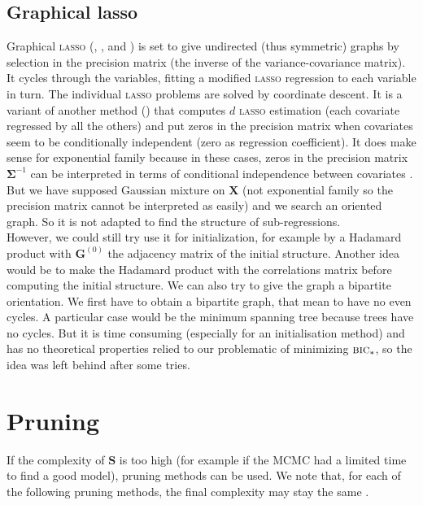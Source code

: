 \documentclass[12pt,a4paper]{report}
\begin{document}
	\subsection{Graphical { \sc lasso}}\label{sectionGlasso}
		Graphical \textsc{lasso} (\cite{friedman2008sparse}, \cite{witten2011new}, \cite{tibshiranilasso} and \cite{friedman2010applications}) is set to give undirected (thus symmetric) graphs by selection in the precision matrix (the inverse of the variance-covariance matrix). It cycles through the variables, fitting a modified \textsc{lasso} regression to each variable in turn. The individual \textsc{lasso} problems are solved by coordinate descent. It is a variant of another method (\cite{meinshausen2006high}) that computes $d$ \textsc{lasso} estimation (each covariate regressed by all the others) and put zeros in the precision matrix when covariates seem to be conditionally independent (zero as regression coefficient).
		It does make sense for exponential family because in these cases, zeros in the precision matrix $\boldsymbol{\Sigma}^{-1}$ can be interpreted in terms of conditional independence between covariates \cite{dempster1972covariance}. But we have supposed Gaussian mixture on $\boldsymbol{X}$ (not exponential family so the precision matrix cannot be interpreted as easily) and we search an oriented graph. So it is not adapted to find the structure of sub-regressions.\\
		
	However, we could still try use it for initialization, for example by a Hadamard product with $\boldsymbol{G}^{(0)}$ the adjacency matrix of the initial structure. Another idea would be to make the Hadamard product with the correlations matrix before computing the initial structure. We can also try to give the graph a bipartite orientation. We first have to obtain a bipartite graph, that mean to have no even cycles. A particular case would be the minimum spanning tree \cite{graham1985history,moret1991empirical,gower1969minimum} because trees have no cycles. But it is time consuming (especially for an initialisation method) and has no theoretical properties relied to our problematic of minimizing $\mbox{{\sc bic}}_*$, so the idea was left behind after some tries.		
	
	\section{Pruning}
		If the complexity of $\boldsymbol{S}$ is too high (for example if the MCMC had a limited time to find a good model), pruning methods can be used. We note that, for each of the following pruning methods, the final complexity may stay the same .
\end{document}
